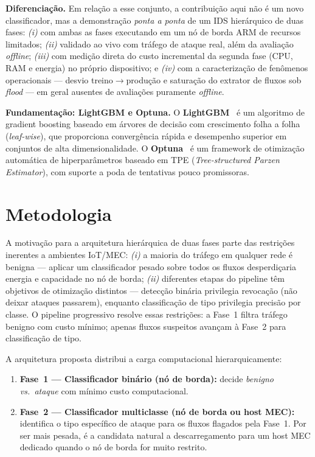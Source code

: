 \documentclass[12pt]{article}
\begin{document}
\textbf{Diferenciação.} Em relação a esse conjunto, a contribuição aqui não é um
novo classificador, mas a demonstração \textit{ponta a ponta} de um IDS
hierárquico de duas fases: \textit{(i)} com ambas as fases executando em um nó de
borda ARM de recursos limitados; \textit{(ii)} validado ao vivo com tráfego de
ataque real, além da avaliação \textit{offline}; \textit{(iii)} com medição
direta do custo incremental da segunda fase (CPU, RAM e energia) no próprio
dispositivo; e \textit{(iv)} com a caracterização de fenômenos operacionais —
desvio treino$\rightarrow$produção e saturação do extrator de fluxos sob
\textit{flood} — em geral ausentes de avaliações puramente \textit{offline}.

\textbf{Fundamentação: LightGBM e Optuna.}
O \textbf{LightGBM}~\cite{ke:17} é um algoritmo de gradient boosting baseado
em árvores de decisão com crescimento folha a folha (\textit{leaf-wise}), que
proporciona convergência rápida e desempenho superior em conjuntos de alta
dimensionalidade. O \textbf{Optuna}~\cite{akiba:19} é um framework de
otimização automática de hiperparâmetros baseado em TPE (\textit{Tree-structured
Parzen Estimator}), com suporte a poda de tentativas pouco promissoras.

\section{Metodologia}
\label{sec:metodologia}

A motivação para a arquitetura hierárquica de duas fases parte das restrições
inerentes a ambientes IoT/MEC: \textit{(i)} a maioria do tráfego em qualquer
rede é benigna — aplicar um classificador pesado sobre todos os fluxos
desperdiçaria energia e capacidade no nó de borda; \textit{(ii)} diferentes etapas do
pipeline têm objetivos de otimização distintos — detecção binária privilegia
revocação (não deixar ataques passarem), enquanto classificação de tipo privilegia
precisão por classe. O pipeline progressivo resolve essas restrições: a Fase~1
filtra tráfego benigno com custo mínimo; apenas fluxos suspeitos avançam à
Fase~2 para classificação de tipo.

A arquitetura proposta distribui a carga computacional hierarquicamente:

\begin{enumerate}
  \item \textbf{Fase~1 — Classificador binário (nó de borda):} decide
    \textit{benigno vs.\ ataque} com mínimo custo computacional.
  \item \textbf{Fase~2 — Classificador multiclasse (nó de borda ou host MEC):}
    identifica o tipo específico de ataque para os fluxos flagados pela Fase~1.
    Por ser mais pesada, é a candidata natural a descarregamento para um host MEC
    dedicado quando o nó de borda for muito restrito.
\end{enumerate}
\end{document}
